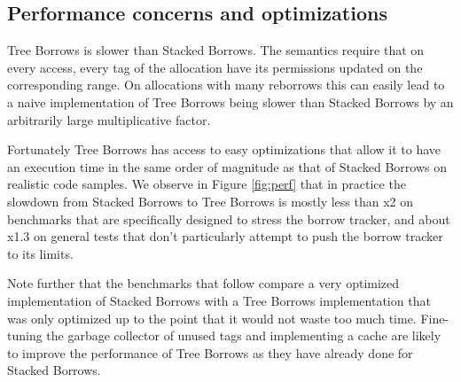 \documentclass[a4paper,11pt]{article}
\theoremstyle{plain}
\theoremstyle{definition}
\theoremstyle{remark}
\begin{document}
\subsection{Performance concerns and optimizations}
\label{sec:perf}

Tree Borrows is slower than Stacked Borrows.
The semantics require that on every access, every tag of the allocation have its
permissions updated on the corresponding range. On allocations with many reborrows
this can easily lead to a naive implementation of Tree Borrows being slower than
Stacked Borrows by an arbitrarily large multiplicative factor.


Fortunately Tree Borrows has access to easy optimizations that allow it to have
an execution time in the same order of magnitude as that of Stacked Borrows on
realistic code samples. We observe in Figure \ref{fig:perf} that in practice the slowdown from Stacked Borrows
to Tree Borrows is mostly less than x2 on benchmarks that are specifically designed
to stress the borrow tracker, and about x1.3 on general tests that don't particularly attempt to
push the borrow tracker to its limits.

Note further that the benchmarks that follow compare a very optimized implementation
of Stacked Borrows with a Tree Borrows implementation that was only optimized up to
the point that it would not waste too much time. Fine-tuning the garbage collector
of unused tags and implementing a cache are likely to improve the performance of
Tree Borrows as they have already done for Stacked Borrows.
\end{document}
